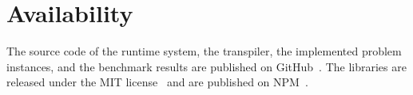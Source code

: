 \section{Availability}
The source code of the runtime system, the transpiler, the implemented problem instances, and the benchmark results are published on GitHub~\cite{parallelEs, parallelEsBabel, parallelEsWebpack, parallelEsExample}. The libraries are released under the MIT license~\cite{mit} and are published on NPM~\cite{npm}.
